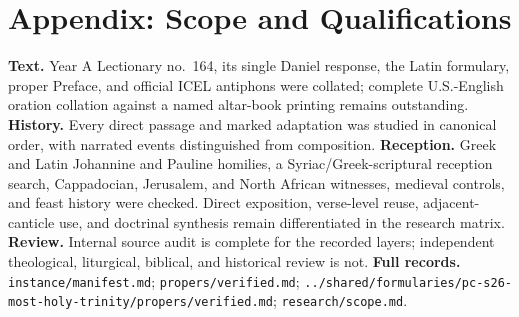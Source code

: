 \section*{Appendix: Scope and Qualifications}

\begin{studyframe}
\textbf{Text.} Year A Lectionary no.~164, its single Daniel response, the Latin formulary, proper Preface, and official ICEL antiphons were collated; complete U.S.-English oration collation against a named altar-book printing remains outstanding. \textbf{History.} Every direct passage and marked adaptation was studied in canonical order, with narrated events distinguished from composition. \textbf{Reception.} Greek and Latin Johannine and Pauline homilies, a Syriac/Greek-scriptural reception search, Cappadocian, Jerusalem, and North African witnesses, medieval controls, and feast history were checked. Direct exposition, verse-level reuse, adjacent-canticle use, and doctrinal synthesis remain differentiated in the research matrix. \textbf{Review.} Internal source audit is complete for the recorded layers; independent theological, liturgical, biblical, and historical review is not. \textbf{Full records.} \nolinkurl{instance/manifest.md}; \nolinkurl{propers/verified.md}; \nolinkurl{../shared/formularies/pc-s26-most-holy-trinity/propers/verified.md}; \nolinkurl{research/scope.md}.
\end{studyframe}

